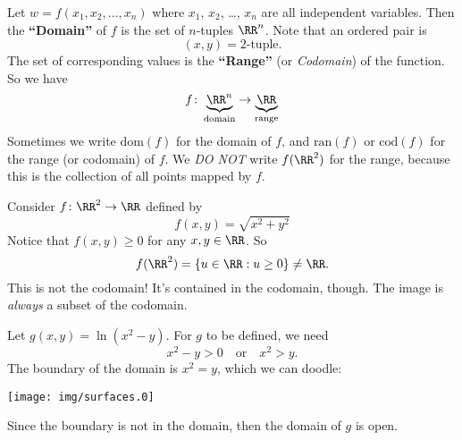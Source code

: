 \M
Let $w=f(x_{1},x_{2},\dots,x_{n})$ where $x_{1}$, $x_{2}$, \dots,
$x_{n}$ are all independent variables. Then the
\textbf{``Domain''} of $f$ is the set of $n$-tuples
$\RR^{n}$. Note that an ordered pair is 
\begin{equation}
(x,y)=\mbox{2-tuple}.
\end{equation}
The set of corresponding values is the \textbf{``Range''} (or
\emph{Codomain}) of the function. So we have
\begin{equation}
f\colon\underbrace{\RR^{n}}_{\text{domain}}\to\underbrace{\RR}_{\text{range}}
\end{equation}
Sometimes we write $\mathrm{dom}(f)$ for the domain of $f$, and
$\mathrm{ran}(f)$ or $\mathrm{cod}(f)$ for the range (or
codomain) of $f$. We \emph{DO NOT} write $f(\RR^{2})$ for the
range, because this is the collection of all points mapped by
$f$. 

\begin{example}
Consider $f\colon\RR^{2}\to\RR$ defined by
\begin{equation}
f(x,y) = \sqrt{x^{2}+y^{2}}
\end{equation}
Notice that $f(x,y)\geq0$ for any $x,y\in\RR$. So
\begin{equation}
f(\RR^{2})=\{ u\in\RR : u\geq0\}\not=\RR.
\end{equation}
This is not the codomain! It's contained in the codomain,
though. The image is \emph{always} a subset of the codomain.
\end{example}
\more

\begin{example}
Let $g(x,y)=\ln(x^{2}-y)$. For $g$ to be defined, we need
\begin{equation}
x^{2}-y>0\quad\mbox{or}\quad x^{2}>y.
\end{equation}
The boundary of the domain is $x^{2}=y$, which we can doodle:
\begin{center}
  \texttt{[image: img/surfaces.0]}
\end{center}
Since the boundary is not in the domain, then the domain of $g$
is open.
\end{example}

